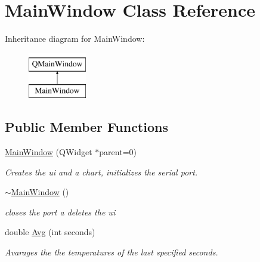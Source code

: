 \hypertarget{class_main_window}{}\section{Main\+Window Class Reference}
\label{class_main_window}
Inheritance diagram for Main\+Window\+:\begin{figure}[H]
\begin{center}
\leavevmode
\includegraphics[height=2.000000cm]{class_main_window}
\end{center}
\end{figure}
\subsection*{Public Member Functions}
\begin{DoxyCompactItemize}
\item 
\hyperlink{class_main_window_a8b244be8b7b7db1b08de2a2acb9409db}{Main\+Window} (Q\+Widget $\ast$parent=0)\hypertarget{class_main_window_a8b244be8b7b7db1b08de2a2acb9409db}{}\label{class_main_window_a8b244be8b7b7db1b08de2a2acb9409db}

\begin{DoxyCompactList}\small\item\em Creates the ui and a chart, initializes the serial port. \end{DoxyCompactList}\item 
\hyperlink{class_main_window_ae98d00a93bc118200eeef9f9bba1dba7}{$\sim$\+Main\+Window} ()\hypertarget{class_main_window_ae98d00a93bc118200eeef9f9bba1dba7}{}\label{class_main_window_ae98d00a93bc118200eeef9f9bba1dba7}

\begin{DoxyCompactList}\small\item\em closes the port a deletes the ui \end{DoxyCompactList}\item 
double \hyperlink{class_main_window_abc17298493600e810834db8652ef07d6}{Avg} (int seconds)
\begin{DoxyCompactList}\small\item\em Avarages the the temperatures of the last specified seconds. \end{DoxyCompactList}\end{DoxyCompactItemize}


